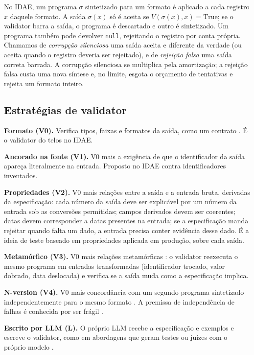 \documentclass[sigconf,nonacm]{acmart}
\begin{document}
No IDAE, um programa $\sigma$ sintetizado para um formato é aplicado a cada registro $x$ daquele formato. A saída $\sigma(x)$ só é aceita se $V(\sigma(x), x) = \text{True}$; se o validator barra a saída, o programa é descartado e outro é sintetizado. Um programa também pode devolver \texttt{null}, rejeitando o registro por conta própria. Chamamos de \textit{corrupção silenciosa} uma saída aceita e diferente da verdade (ou aceita quando o registro deveria ser rejeitado), e de \textit{rejeição falsa} uma saída correta barrada. A corrupção silenciosa se multiplica pela amortização; a rejeição falsa custa uma nova síntese e, no limite, esgota o orçamento de tentativas e rejeita um formato inteiro.

\subsection{Estratégias de validator}

\textbf{Formato (V0).} Verifica tipos, faixas e formatos da saída, como um contrato \cite{meyer1997object}. É o validator do telos no IDAE.

\textbf{Ancorado na fonte (V1).} V0 mais a exigência de que o identificador da saída apareça literalmente na entrada. Proposto no IDAE contra identificadores inventados.

\textbf{Propriedades (V2).} V0 mais relações entre a saída e a entrada bruta, derivadas da especificação: cada número da saída deve ser explicável por um número da entrada sob as conversões permitidas; campos derivados devem ser coerentes; datas devem corresponder a datas presentes na entrada; se a especificação manda rejeitar quando falta um dado, a entrada precisa conter evidência desse dado. É a ideia de teste baseado em propriedades \cite{claessen2000quickcheck} aplicada em produção, sobre cada saída.

\textbf{Metamórfico (V3).} V0 mais relações metamórficas \cite{chen1998metamorphic,segura2016survey}: o validator reexecuta o mesmo programa em entradas transformadas (identificador trocado, valor dobrado, data deslocada) e verifica se a saída muda como a especificação implica.

\textbf{N-version (V4).} V0 mais concordância com um segundo programa sintetizado independentemente para o mesmo formato \cite{avizienis1985nversion,ron2024galapagos}. A premissa de independência de falhas é conhecida por ser frágil \cite{knight1986experimental}.

\textbf{Escrito por LLM (L).} O próprio LLM recebe a especificação e exemplos e escreve o validator, como em abordagens que geram testes ou juízes com o próprio modelo \cite{chen2022codet,zheng2023judging}.
\end{document}
